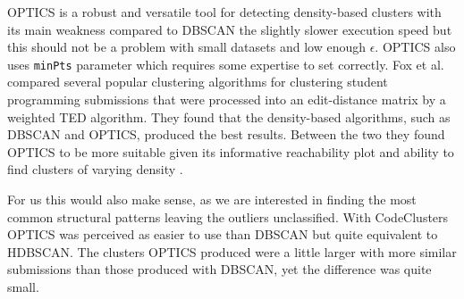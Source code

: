 OPTICS is a robust and versatile tool for detecting density-based clusters with its main weakness compared to DBSCAN the slightly slower execution speed but this should not be a problem with small datasets and low enough $\epsilon$. OPTICS also uses \texttt{minPts} parameter which requires some expertise to set correctly. Fox et al. compared several popular clustering algorithms for clustering student programming submissions that were processed into an edit-distance matrix by a weighted TED algorithm. They found that the density-based algorithms, such as DBSCAN and OPTICS, produced the best results. Between the two they found OPTICS to be more suitable given its informative reachability plot and ability to find clusters of varying density \cite{fox-clust-leverage-2015}.

For us this would also make sense, as we are interested in finding the most common structural patterns leaving the outliers unclassified. With CodeClusters OPTICS was perceived as easier to use than DBSCAN but quite equivalent to HDBSCAN. The clusters OPTICS produced were a little larger with more similar submissions than those produced with DBSCAN, yet the difference was quite small.
